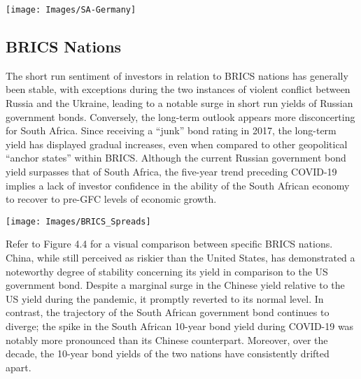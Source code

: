 \documentclass[11pt,preprint, authoryear]{elsarticle}
\let\origfigure\figure
\let\endorigfigure\endfigure
\renewenvironment{figure}[1][2] {
    \expandafter\origfigure\expandafter[H]
} {
    \endorigfigure
}
\numberwithin{equation}{section}
\numberwithin{figure}{section}
\numberwithin{table}{section}
\begin{document}
\begin{figure}

{\centering \texttt{[image: Images/SA-Germany]} 

}

\caption{South Africa vs Germany Yield Spread \label{Figure4.2}}\label{fig:unnamed-chunk-9}
\end{figure}

\hypertarget{brics-nations}{%
\subsection{BRICS Nations}\label{brics-nations}}

The short run sentiment of investors in relation to BRICS nations has
generally been stable, with exceptions during the two instances of
violent conflict between Russia and the Ukraine, leading to a notable
surge in short run yields of Russian government bonds. Conversely, the
long-term outlook appears more disconcerting for South Africa. Since
receiving a ``junk'' bond rating in 2017, the long-term yield has
displayed gradual increases, even when compared to other geopolitical
``anchor states'' within BRICS. Although the current Russian government
bond yield surpasses that of South Africa, the five-year trend preceding
COVID-19 implies a lack of investor confidence in the ability of the
South African economy to recover to pre-GFC levels of economic growth.

\begin{figure}

{\centering \texttt{[image: Images/BRICS\_Spreads]} 

}

\caption{BRICS Bond Yield Spreads \label{Figure4.3}}\label{fig:unnamed-chunk-10}
\end{figure}

Refer to Figure 4.4 for a visual comparison between specific BRICS
nations. China, while still perceived as riskier than the United States,
has demonstrated a noteworthy degree of stability concerning its yield
in comparison to the US government bond. Despite a marginal surge in the
Chinese yield relative to the US yield during the pandemic, it promptly
reverted to its normal level. In contrast, the trajectory of the South
African government bond continues to diverge; the spike in the South
African 10-year bond yield during COVID-19 was notably more pronounced
than its Chinese counterpart. Moreover, over the decade, the 10-year
bond yields of the two nations have consistently drifted apart.
\end{document}
